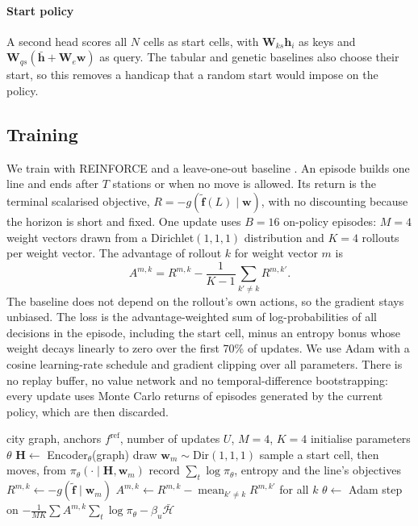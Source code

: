 \paragraph{Start policy} A second head scores all $N$ cells as start cells, with $\mathbf W_{ks}\mathbf h_i$ as keys and $\mathbf W_{qs}(\bar{\mathbf h}+\mathbf W_e\mathbf w)$ as query. The tabular and genetic baselines also choose their start, so this removes a handicap that a random start would impose on the policy.

\subsection{Training}\label{sec:training}
We train with REINFORCE \citep{williams1992} and a leave-one-out baseline \citep{kool2019}. An episode builds one line and ends after $T$ stations or when no move is allowed. Its return is the terminal scalarised objective, $R=-g(\tilde{\mathbf f}(L)\mid\mathbf w)$, with no discounting because the horizon is short and fixed. One update uses $B=16$ on-policy episodes: $M=4$ weight vectors drawn from a Dirichlet$(1,1,1)$ distribution and $K=4$ rollouts per weight vector. The advantage of rollout $k$ for weight vector $m$ is
\begin{equation}
A^{m,k}=R^{m,k}-\frac{1}{K-1}\sum_{k'\ne k}R^{m,k'} .
\end{equation}
The baseline does not depend on the rollout's own actions, so the gradient stays unbiased. The loss is the advantage-weighted sum of log-probabilities of all decisions in the episode, including the start cell, minus an entropy bonus whose weight decays linearly to zero over the first 70\% of updates. We use Adam with a cosine learning-rate schedule and gradient clipping over all parameters. There is no replay buffer, no value network and no temporal-difference bootstrapping: every update uses Monte Carlo returns of episodes generated by the current policy, which are then discarded.

\begin{algorithm}[t]
\caption{Weight-conditioned REINFORCE with a leave-one-out baseline}\label{alg:train}
\begin{algorithmic}[1]
\Require city graph, anchors $f^{\mathrm{ref}}$, number of updates $U$, $M=4$, $K=4$
\State initialise parameters $\theta$
  \State $\mathbf H\gets$ Encoder$_\theta$(graph) 
    \State draw $\mathbf w_m\sim\mathrm{Dir}(1,1,1)$
      \State sample a start cell, then moves, from $\pi_\theta(\cdot\mid\mathbf H,\mathbf w_m)$
      \State record $\sum_t\log\pi_\theta$, entropy and the line's objectives
      \State $R^{m,k}\gets-g(\tilde{\mathbf f}\mid\mathbf w_m)$
    \EndFor
    \State $A^{m,k}\gets R^{m,k}-\operatorname{mean}_{k'\ne k}R^{m,k'}$ for all $k$
  \EndFor
  \State $\theta\gets$ Adam step on $-\tfrac1{MK}\sum A^{m,k}\sum_t\log\pi_\theta-\beta_u\bar{\mathcal H}$
\EndFor
\end{algorithmic}
\end{algorithm}


